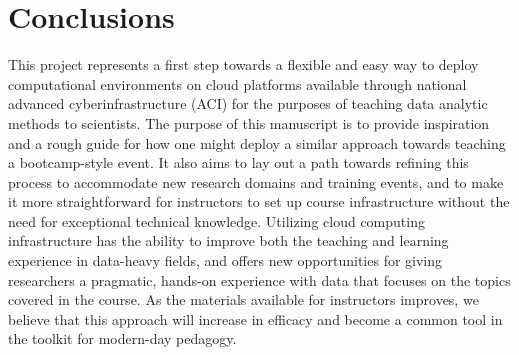 \section{Conclusions}

This project represents a first step towards a flexible and easy way to deploy
computational environments on cloud platforms available through national
advanced cyberinfrastructure (ACI) for the purposes of teaching data analytic
methods to scientists. The purpose of this manuscript is to provide inspiration
and a rough guide for how one might deploy a similar approach towards teaching a
bootcamp-style event. It also aims to lay out a path towards refining this
process to accommodate new research domains and training events, and to make it
more straightforward for instructors to set up course infrastructure without the
need for exceptional technical knowledge. Utilizing cloud computing
infrastructure has the ability to improve both the teaching and learning
experience in data-heavy fields, and offers new opportunities for giving
researchers a pragmatic, hands-on experience with data that focuses on the
topics covered in the course. As the materials available for instructors
improves, we believe that this approach will increase in efficacy and become a
common tool in the toolkit for modern-day pedagogy.
